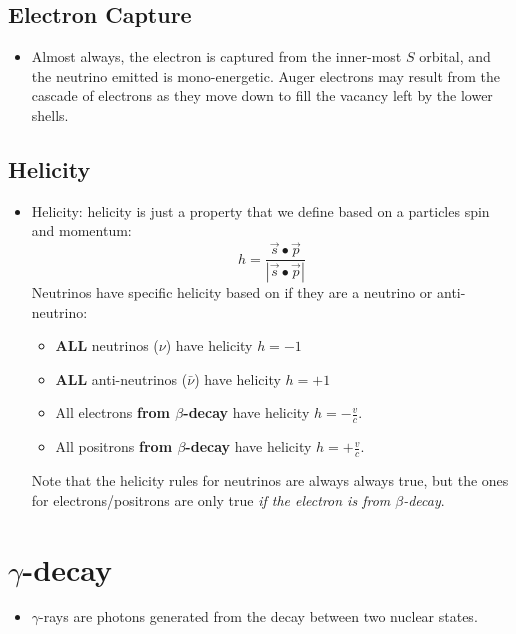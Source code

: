 \documentclass[letter]{article}
\begin{document}
\subsection{Electron Capture}

\begin{itemize}
\item Almost always, the electron is captured from the inner-most $S$
  orbital, and the neutrino emitted is mono-energetic. Auger electrons
  may result from the cascade of electrons as they move down to fill
  the vacancy left by the lower shells.~\cite[Lec. 19-21]{lecture}
\end{itemize}

\subsection{Helicity}

\begin{itemize}
\item Helicity: helicity is just a property that we define based
  on a particles spin and momentum:
  \begin{equation*}
    h=\frac{\vec{s}\bullet\vec{p}}{|\vec{s}\bullet\vec{p}|}
  \end{equation*}
  Neutrinos have specific helicity based on if they are a neutrino or
  anti-neutrino:
  \begin{itemize}
  \item \textbf{ALL} neutrinos ($\nu$) have helicity $h=-1$
  \item \textbf{ALL} anti-neutrinos ($\bar{\nu}$) have helicity $h=+1$
  \item All electrons \textbf{from $\beta$-decay} have helicity
    $h=-\frac{v}{c}$.
  \item All positrons \textbf{from $\beta$-decay} have helicity
    $h=+\frac{v}{c}$.
  \end{itemize}
  Note that the helicity rules for neutrinos are always always true,
  but the ones for electrons/positrons are only true \textit{if the
    electron is from $\beta$-decay}.
\end{itemize}

\section{$\gamma$-decay}

\begin{itemize}
\item $\gamma$-rays are photons generated from the decay between two
  nuclear states.
\end{itemize}



\end{document}
